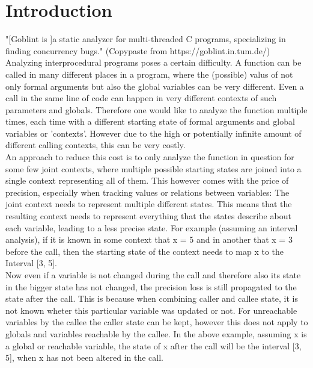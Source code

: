 
\chapter{Introduction}\label{chapter:introduction}

  "[Goblint is ]a static analyzer for multi-threaded C programs, specializing in finding concurrency bugs." (Copypaste from https://goblint.in.tum.de/)
  Analyzing interprocedural programs poses a certain difficulty. A function can be called in many different places in a program, where the (possible) valus of not only formal arguments but also the global variables can be very different. Even a call in the same line of code can happen in very different contexts of such parameters and globals. Therefore one would like to analyze the function multiple times, each time with a different starting state of formal arguments and global variables or 'contexts'. However due to the high or potentially infinite amount of different calling contexts, this can be very costly. \\
An approach to reduce this cost is to only analyze the function in question for some few joint contexts, where multiple possible starting states are joined into a single context representing all of them. This however comes with the price of precision, especially when tracking values or relations between variables: The joint context needs to represent multiple different states. This means that the resulting context needs to represent everything that the states describe about each variable, leading to a less precise state. For example (assuming an interval analysis), if it is known in some context that x = 5 and in another that x = 3 before the call, then the starting state of the context needs to map x to the Interval [3, 5]. \\
Now even if a variable is not changed during the call and therefore also its state in the bigger state has not changed, the precision loss is still propagated to the state after the call. This is because when combining caller and callee state, it is not known wheter this particular variable was updated or not. For unreachable variables by the callee the caller state can be kept, however this does not apply to globals and variables reachable by the callee. In the above example, assuming x is a global or reachable variable, the state of x after the call will be the interval [3, 5], when x has not been altered in the call.\\
